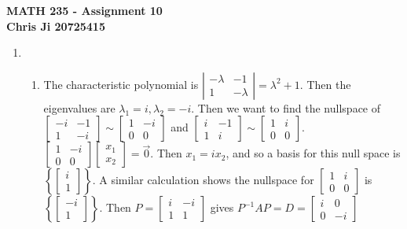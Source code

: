 \documentclass[10pt,english]{article}
\begin{document}
\noindent \begin{center}
\textbf{\large{}MATH 235 - Assignment 10}\\
\textbf{\large{}Chris Ji 20725415}
\par\end{center}{\large \par}
\medskip{}

\begin{enumerate}
\item \begin{enumerate}
    \item The characteristic polynomial is $\left|\begin{matrix}-\lambda &-1\\1&-\lambda\end{matrix}\right|=\lambda^2+1$. Then the eigenvalues are $\lambda_1=i,\lambda_2=-i$. Then we want to find the nullspace of $\begin{bmatrix}-i&-1\\1&-i\end{bmatrix}\sim\begin{bmatrix}1&-i\\0&0\end{bmatrix}$ and $\begin{bmatrix}i&-1\\1&i\end{bmatrix}\sim\begin{bmatrix}1&i\\0&0\end{bmatrix}$. $\begin{bmatrix}1&-i\\0&0\end{bmatrix}\begin{bmatrix}x_1\\x_2\end{bmatrix}=\vec{0}$. Then $x_1=ix_2$, and so a basis for this null space is $\left\{\begin{bmatrix}i\\1\end{bmatrix}\right\}$. A similar calculation shows the nullspace for $\begin{bmatrix}1&i\\0&0\end{bmatrix}$ is $\left\{\begin{bmatrix}-i\\1\end{bmatrix}\right\}$. Then $P=\begin{bmatrix}i&-i\\1&1\end{bmatrix}$ gives $P^{-1}AP=D=\begin{bmatrix}i&0\\0&-i\end{bmatrix}$ 

\end{enumerate}
\end{enumerate}
\end{document}
